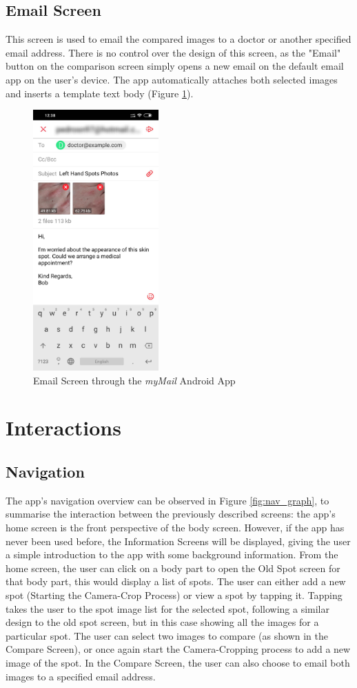 \subsection{Email Screen}
This screen is used to email the compared images to a doctor or another specified email address. There is no control over the design of this screen, as the "Email" button on the comparison screen simply opens a new email on the default email app on the user's device. The app automatically attaches both selected images and inserts a template text body (Figure \ref{fig:emailscreen}). 

\begin{figure}
    \includegraphics[height=10cm, center]{figures/email_android.jpg}
    \caption{Email Screen through the \emph{myMail} Android App}
    \label{fig:emailscreen}
\end{figure}

\section{Interactions}
\subsection{Navigation}
The app's navigation overview can be observed in Figure \ref{fig:nav_graph}, to summarise the interaction between the previously described screens: the app's home screen is the front perspective of the body screen. However, if the app has never been used before, the Information Screens will be displayed, giving the user a simple introduction to the app with some background information. From the home screen, the user can click on a body part to open the Old Spot screen for that body part, this would display a list of spots. The user can either add a new spot (Starting the Camera-Crop Process) or view a spot by tapping it. Tapping takes the user to the spot image list for the selected spot, following a similar design to the old spot screen, but in this case showing all the images for a particular spot. The user can select two images to compare (as shown in the Compare Screen), or once again start the Camera-Cropping process to add a new image of the spot. In the Compare Screen, the user can also choose to email both images to a specified email address.

